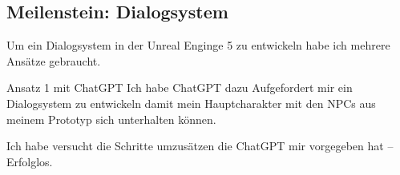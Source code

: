 \documentclass[10pt,a4paper,bibliography=totocnumbered,listof=totocnumbered]{scrartcl}
\begin{document}
\subsection {Meilenstein: Dialogsystem}
Um ein Dialogsystem in der Unreal Enginge 5 zu entwickeln habe ich mehrere Ansätze gebraucht.
 
Ansatz 1 mit ChatGPT
Ich habe ChatGPT dazu Aufgefordert mir ein Dialogsystem zu entwickeln damit mein Hauptcharakter mit den NPCs aus meinem Prototyp sich unterhalten können.
 
Ich habe versucht die Schritte umzusätzen die ChatGPT mir vorgegeben hat – Erfolglos.
 
\end{document}
